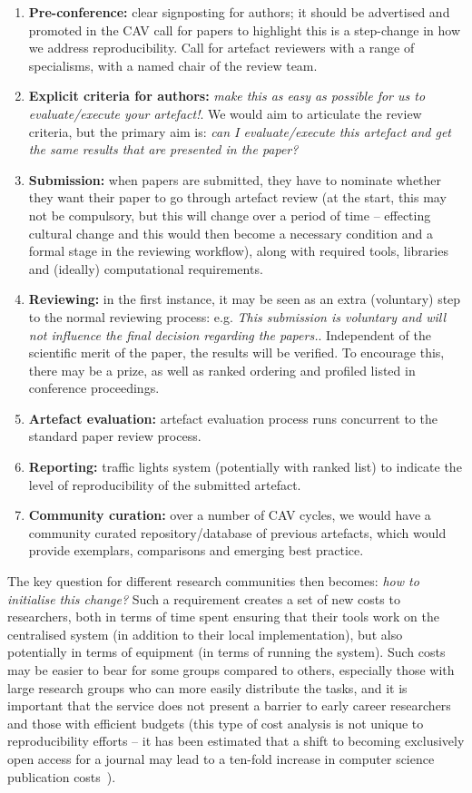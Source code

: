 \documentclass[conference]{IEEEtran}
\begin{document}
\begin{enumerate}
\item {\textbf{Pre-conference:}} clear signposting for authors; it
should be advertised and promoted in the CAV call for papers to
highlight this is a step-change in how we address
reproducibility. Call for artefact reviewers with a range of
specialisms, with a named chair of the review team.
\item {\textbf{Explicit criteria for authors:}} {\emph{make this as
easy as possible for us to evaluate/execute your artefact!}}. We would
aim to articulate the review criteria, but the primary aim is:
{\emph{can I evaluate/execute this artefact and get the same results
that are presented in the paper?}}
\item {\textbf{Submission:}} when papers are submitted, they have to
nominate whether they want their paper to go through artefact review
(at the start, this may not be compulsory, but this will change over a
period of time -- effecting cultural change and this would then become
a necessary condition and a formal stage in the reviewing workflow),
along with required tools, libraries and (ideally) computational
requirements.
\item {\textbf{Reviewing:}} in the first instance, it may be seen as
an extra (voluntary) step to the normal reviewing process:
e.g. {\emph{This submission is voluntary and will not influence the
final decision regarding the papers.}}. Independent of the scientific
merit of the paper, the results will be verified. To encourage this,
there may be a prize, as well as ranked ordering and profiled listed
in conference proceedings.
\item {\textbf{Artefact evaluation:}} artefact evaluation process runs
concurrent to the standard paper review process.
\item {\textbf{Reporting:}} traffic lights system (potentially with
ranked list) to indicate the level of reproducibility of the submitted
artefact.
\item {\textbf{Community curation:}} over a number of CAV cycles, we
would have a community curated repository/database of previous
artefacts, which would provide exemplars, comparisons and emerging
best practice.
\end{enumerate}

The key question for different research communities then becomes:
{\emph{how to initialise this change?}} Such a requirement creates a
set of new costs to researchers, both in terms of time spent ensuring
that their tools work on the centralised system (in addition to their
local implementation), but also potentially in terms of equipment (in
terms of running the system). Such costs may be easier to bear for
some groups compared to others, especially those with large research
groups who can more easily distribute the tasks, and it is important
that the service does not present a barrier to early career
researchers and those with efficient budgets (this type of cost
analysis is not unique to reproducibility efforts -- it has been
estimated that a shift to becoming exclusively open access for a
journal may lead to a ten-fold increase in computer science
publication costs~\cite{vardi-cacm-2014}).
\end{document}
